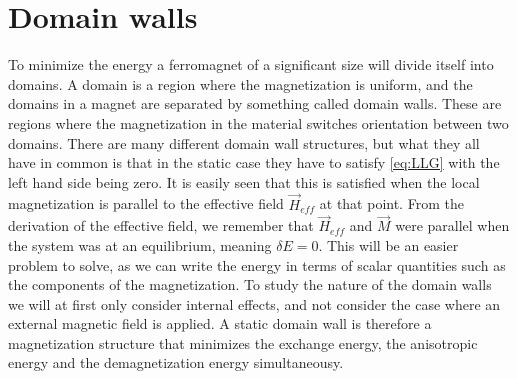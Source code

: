 \documentclass[12pt, a4paper]{article}		%
\numberwithin{equation}{section}
\begin{document}
\section{Domain walls}
To minimize the energy a ferromagnet of a significant size will divide itself into domains. A domain is a region where the magnetization is uniform, and the domains in a magnet are separated by something called domain walls. These are regions where the magnetization in the material switches orientation between two domains. There are many different domain wall structures, but what they all have in common is that in the static case they have to satisfy \eqref{eq:LLG} with the left hand side being zero. It is easily seen that this is satisfied when the local magnetization is parallel to the effective field $\vec{H}_{eff}$ at that point. From the derivation of the effective field, we remember that $\vec{H}_{eff}$ and $\vec{M}$ were parallel when the system was at an equilibrium, meaning $\delta E = 0$. This will be an easier problem to solve, as we can write the energy in terms of scalar quantities such as the components of the magnetization. To study the nature of the domain walls we will at first only consider internal effects, and not consider the case where an external magnetic field is applied. A static domain wall is therefore a magnetization structure that minimizes the exchange energy, the anisotropic energy and the demagnetization energy simultaneousy.
\end{document}
